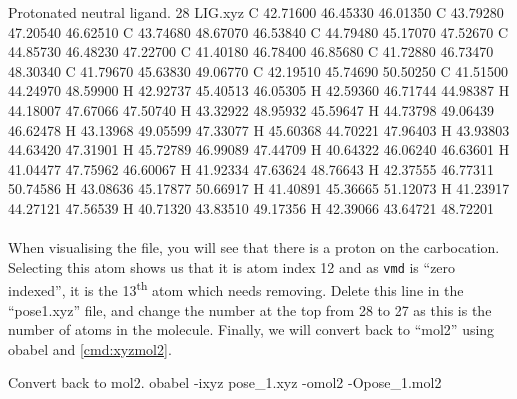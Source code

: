     \begin{bashoutput}[label=out:xyz]{Protonated neutral ligand.}
28
LIG.xyz
C         42.71600       46.45330       46.01350
C         43.79280       47.20540       46.62510
C         43.74680       48.67070       46.53840
C         44.79480       45.17070       47.52670
C         44.85730       46.48230       47.22700
C         41.40180       46.78400       46.85680
C         41.72880       46.73470       48.30340
C         41.79670       45.63830       49.06770
C         42.19510       45.74690       50.50250
C         41.51500       44.24970       48.59900
H         42.92737       45.40513       46.05305
H         42.59360       46.71744       44.98387
H         44.18007       47.67066       47.50740
H         43.32922       48.95932       45.59647
H         44.73798       49.06439       46.62478
H         43.13968       49.05599       47.33077
H         45.60368       44.70221       47.96403
H         43.93803       44.63420       47.31901
H         45.72789       46.99089       47.44709
H         40.64322       46.06240       46.63601
H         41.04477       47.75962       46.60067
H         41.92334       47.63624       48.76643
H         42.37555       46.77311       50.74586
H         43.08636       45.17877       50.66917
H         41.40891       45.36665       51.12073
H         41.23917       44.27121       47.56539
H         40.71320       43.83510       49.17356
H         42.39066       43.64721       48.72201
    
    \end{bashoutput}

    \paragraph{}
        When visualising the file, you will see that there is a proton on the carbocation. Selecting this atom shows us that it is atom index 12 and as \texttt{vmd} is \enquote{zero indexed}, it is the 13\textsuperscript{th} atom which needs removing. Delete this line in the \enquote{pose\textunderscore 1.xyz} file, and change the number at the top from 28 to 27 as this is the number of atoms in the molecule. Finally, we will convert back to \enquote{mol2} using obabel and \cref{cmd:xyzmol2}.

    \begin{bashcmd}[label=cmd:xyzmol2]{Convert back to mol2.}
        obabel -ixyz pose_1.xyz -omol2 -Opose_1.mol2
    \end{bashcmd}


